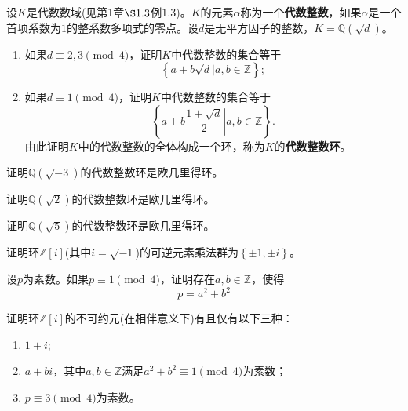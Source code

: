 \begin{prob}
设$K$是代数数域(见第1章$\S1.3$例$1.3$)。$K$的元素$\alpha $称为一个{\bfseries 代数整数}，如果$\alpha $是一个首项系数为$1$的整系数多项式的零点。设$d$是无平方因子的整数，$K=\mathbb{Q}\left(\sqrt{d}\right)$。
\begin{enumerate}[$(1)$]
\item 如果$d\equiv 2,3\pmod{4}$，证明$K$中代数整数的集合等于
\begin{equation*}
\left\{a+b\sqrt{d}\vert a,b\in \mathbb{Z} \right\};
\end{equation*}
\item 如果$d\equiv 1\pmod{4}$，证明$K$中代数整数的集合等于
\begin{equation*}
\left\{\left. a+b\frac{1+\sqrt{d}}{2}\right\vert a,b\in \mathbb{Z} \right\}.
\end{equation*}
由此证明$K$中的代数整数的全体构成一个环，称为$K$的{\bfseries 代数整数环}。
\end{enumerate}
\end{prob}
\begin{prob}
证明$\mathbb{Q}\left(\sqrt{-3}\right)$的代数整数环是欧几里得环。
\end{prob}
\begin{prob}
证明$\mathbb{Q}\left(\sqrt{2}\right)$的代数整数环是欧几里得环。
\end{prob}
\begin{prob}
证明$\mathbb{Q}\left(\sqrt{5}\right)$的代数整数环是欧几里得环。
\end{prob}
\begin{prob}
证明环$\mathbb{Z}[i]$(其中$i=\sqrt{-1}$)的可逆元素乘法群为$\left\{\pm 1,\pm i \right\}$。
\end{prob}
\begin{prob}
设$p$为素数。如果$p\equiv 1\pmod{4}$，证明存在$a,b\in \mathbb{Z}$，使得
\begin{equation*}
p=a^{2}+b^{2}
\end{equation*}
\end{prob}
\begin{prob}
证明环$\mathbb{Z}[i]$的不可约元(在相伴意义下)有且仅有以下三种：
\begin{enumerate}[$(1)$]
\item $1+i$;
\item $a+bi$，其中$a,b\in \mathbb{Z}$满足$a^{2}+b^{2}\equiv 1\pmod{4}$为素数；
\item $p\equiv 3\pmod{4}$为素数。
\end{enumerate}
\end{prob}
